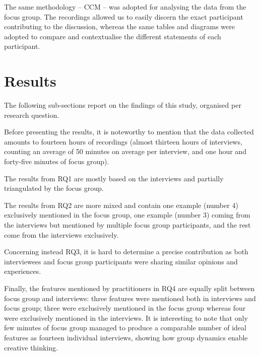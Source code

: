 The same methodology -- CCM -- was adopted for analysing the data from the focus group.
The recordings allowed us to easily discern the exact participant contributing to the discussion, whereas the same tables and diagrams were adopted to compare and contextualise the different statements of each participant.

\section{Results}\label{c7:sec:results}
The following sub-sections report on the findings of this study, organised per research question.

Before presenting the results, it is noteworthy to mention that the data collected amounts to fourteen hours of recordings (almost thirteen hours of interviews, counting an average of 50 minutes on average per interview, and one hour and forty-five minutes of focus group).

The results from RQ1 are mostly based on the interviews and partially triangulated by the focus group.

The results from RQ2 are more mixed and contain one example (number 4) exclusively mentioned in the focus group, one example (number 3) coming from the interviews but mentioned by multiple focus group participants, and the rest come from the interviews exclusively.

Concerning instead RQ3, it is hard to determine a precise contribution as both interviewees and focus group participants were sharing similar opinions and experiences.

Finally, the features mentioned by practitioners in RQ4 are equally split between focus group and interviews: three features were mentioned both in interviews and focus group; three were exclusively mentioned in the focus group whereas four were exclusively mentioned in the interviews.
It is interesting to note that only few minutes of focus group managed to produce a comparable number of ideal features as fourteen individual interviews, showing how group dynamics enable creative thinking.

